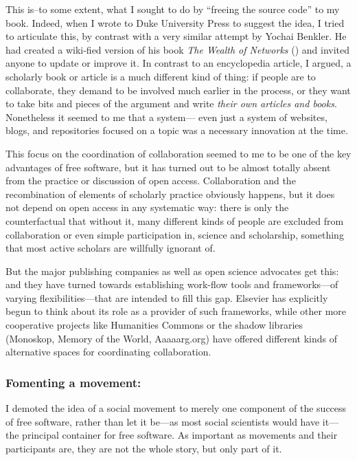 \documentclass[11pt]{article}
\begin{document}
This is--to some extent, what I sought to do by ``freeing the source code'' to my book.  Indeed, when I wrote to Duke University Press to suggest the idea, I tried to articulate this, by contrast with a very similar attempt by Yochai Benkler.  He had created a wiki-fied version of his book \emph{The Wealth of Networks} (\cite{benkler2007wealnetw}) and invited anyone to update or improve it.  In contrast to an encyclopedia article, I argued, a scholarly book or article is a much different kind of thing:  if people are to collaborate, they demand to be involved much earlier in the process, or they want to take bits and pieces of the argument and write \emph{their own articles and books}.  Nonetheless it seemed to me that a system--- even just a system of websites, blogs, and repositories focused on a topic was a necessary innovation at the time. 

This focus on the coordination of collaboration seemed to me to be one of the key advantages of free software, but it has turned out to be almost totally absent from the practice or discussion of open access.  Collaboration and the recombination of elements of scholarly practice obviously happens, but it does not depend on open access in any systematic way: there is only the counterfactual that without it, many different kinds of people are excluded from collaboration or even simple participation in, science and scholarship, something that most active scholars are willfully ignorant of.

But the major publishing companies as well as open science advocates get this: and they have turned towards establishing work-flow tools and frameworks---of varying flexibilities---that are intended to fill this gap.  Elsevier has explicitly begun to think about its role as a provider of such frameworks, while other more cooperative projects like Humanities Commons or the shadow libraries (Monoskop, Memory of the World, Aaaaarg.org) have offered different kinds of alternative spaces for coordinating collaboration.

\subsubsection*{\textbf{Fomenting a movement}:}
\label{sec:orgb17e2c5}

I demoted the idea of a social movement to merely one component of the success of free software, rather than let it be---as most social scientists would have it---the principal container for free software.  As important as movements and their participants are, they are not the whole story, but only part of it.  
\end{document}
